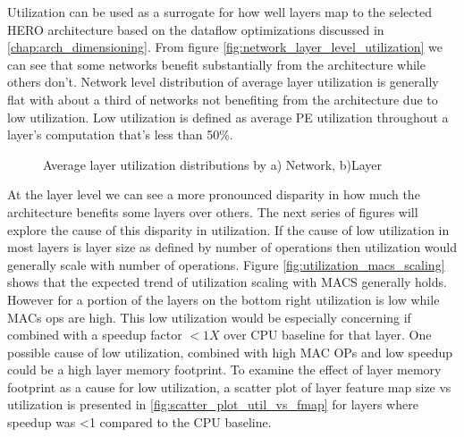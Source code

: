 Utilization can be used as a surrogate for how well layers map to the selected
HERO architecture based on the dataflow optimizations discussed in
\autoref{chap:arch_dimensioning}. From figure
\autoref{fig:network_layer_level_utilization} we can see that some networks benefit substantially from the architecture while
others don't. Network level distribution of average layer utilization is generally flat with
about a third of networks not benefiting from the architecture due to low
utilization. Low utilization is defined as average PE utilization throughout a
layer's computation that's less than 50\%.  


\begin{figure}
    \centering
    \hspace{0.1cm} 
    \caption{Average layer utilization distributions by a) Network, b)Layer}
    \label{fig:network_layer_level_utilization}
\end{figure}

At the layer level we can see a more pronounced disparity in how much the
architecture benefits some layers over others. The next series of figures will
explore the cause of this disparity in utilization. If the cause of low
utilization in most layers is layer size as defined by number of operations then
utilization would generally scale with number of operations. Figure
\autoref{fig:utilization_macs_scaling} shows that the expected trend of
utilization scaling with MACS generally holds. However for a portion of the
layers on the bottom right utilization is low while MACs ops are high. This low
utilization would be especially concerning if combined with a speedup factor
$<1X$ over CPU baseline for that layer. One possible cause of low utilization,
combined with high MAC OPs and low speedup could be a high layer memory
footprint. To examine the effect of layer memory footprint as a cause for low
utilization, a scatter plot of layer feature map size vs utilization is
presented in \autoref{fig:scatter_plot_util_vs_fmap} for layers where speedup
was <1 compared to the CPU baseline. 



